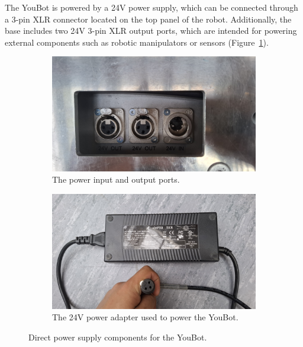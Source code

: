 \documentclass[a4paper, 12pt]{article}
\begin{document}
    The YouBot is powered by a 24V power supply, which can be connected through a 3-pin XLR connector located on the top panel of the robot. Additionally, the base includes two 24V 3-pin XLR output ports, which are intended for powering external components such as robotic manipulators or sensors (Figure~\ref{fig:youbot-power}).

    \begin{figure}[H]
        \centering
        \begin{subfigure}[t]{0.49\linewidth}
            \centering
            \includegraphics[width=\linewidth]{images/sec2/youbot_power.jpg}
            \caption{The power input and output ports.}
            \label{fig:youbot-power}
        \end{subfigure}
        \hfill
        \begin{subfigure}[t]{0.49\linewidth}
            \centering
            \includegraphics[width=\linewidth]{images/sec2/power_adapter.jpg}
            \caption{The 24V power adapter used to power the YouBot.}
        \end{subfigure}
        \caption{Direct power supply components for the YouBot.}
    \end{figure}
\end{document}
